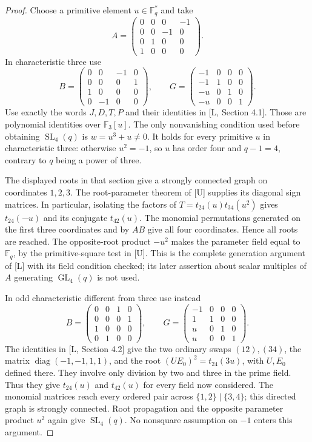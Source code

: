 \documentclass[11pt,a4paper]{article}
\newcommand{\GL}{\operatorname{GL}}
\newcommand{\SL}{\operatorname{SL}}
\newcommand{\diag}{\operatorname{diag}}
\newcommand{\F}{\mathbb F}
\begin{document}
\begin{proof}
Choose a primitive element $u\in\F_q^*$ and take
\[
 A=\begin{pmatrix}0&0&0&-1\\0&0&-1&0\\0&1&0&0\\1&0&0&0\end{pmatrix}.
\]
In characteristic three use
\[
 B=\begin{pmatrix}0&0&-1&0\\0&0&0&1\\1&0&0&0\\0&-1&0&0\end{pmatrix},
 \qquad G=\begin{pmatrix}-1&0&0&0\\-1&1&0&0\\-u&0&1&0\\-u&0&0&1\end{pmatrix}.
\]
Use exactly the words $J,D,T,P$ and their identities in
[L, Section 4.1]. Those are polynomial identities over $\F_3[u]$.
The only nonvanishing condition used before obtaining $\SL_4(q)$
is $w=u^3+u\ne0$. It holds for every primitive $u$ in characteristic
three: otherwise $u^2=-1$, so $u$ has order four and $q-1=4$,
contrary to $q$ being a power of three.

The displayed roots in that section give a strongly connected graph
on coordinates $1,2,3$. The root-parameter theorem of [U] supplies
its diagonal sign matrices. In particular, isolating the factors of
$T=t_{24}(u)t_{34}(u^2)$ gives $t_{24}(-u)$ and its conjugate
$t_{42}(u)$. The monomial permutations generated on the first three
coordinates and by $AB$ give all four coordinates. Hence all roots
are reached. The opposite-root product $-u^2$ makes the parameter
field equal to $\F_q$, by the primitive-square test in [U].
This is the complete generation argument of [L] with its field
condition checked; its later assertion about scalar multiples of $A$
generating $\GL_4(q)$ is not used.

In odd characteristic different from three use instead
\[
 B=\begin{pmatrix}0&0&1&0\\0&0&0&1\\1&0&0&0\\0&1&0&0\end{pmatrix},
 \qquad G=\begin{pmatrix}-1&0&0&0\\1&1&0&0\\u&0&1&0\\u&0&0&1\end{pmatrix}.
\]
The identities in [L, Section 4.2] give the two ordinary swaps
$(12),(34)$, the matrix $\diag(-1,-1,1,1)$, and the root
$(UE_0)^2=t_{24}(3u)$, with $U,E_0$ defined there. They involve
only division by two and three in the prime field. Thus they give
$t_{24}(u)$ and $t_{42}(u)$ for every field now considered.
The monomial matrices reach every ordered pair across
$\{1,2\}\mid\{3,4\}$; this directed graph is strongly connected.
Root propagation and the opposite parameter product $u^2$ again
give $\SL_4(q)$. No nonsquare assumption on $-1$ enters this argument.


\end{proof}
\end{document}

